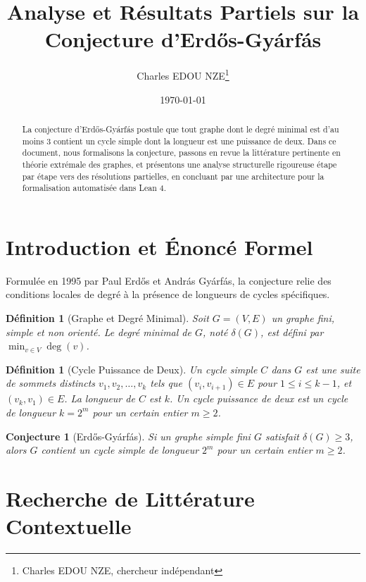 \documentclass[11pt, a4paper]{article}
\title{Analyse et R\'esultats Partiels sur la Conjecture d'Erd\H{o}s-Gy\'arf\'as}
\author{Charles EDOU NZE\thanks{Charles EDOU NZE, chercheur ind\'ependant}}
\date{\today}
\newtheorem{conjecture}[theoreme]{Conjecture}
\newtheorem{definition}[theoreme]{D\'efinition}
\begin{document}
\maketitle

\begin{abstract}
La conjecture d'Erd\H{o}s-Gy\'arf\'as postule que tout graphe dont le degr\'e minimal est d'au moins 3 contient un cycle simple dont la longueur est une puissance de deux. Dans ce document, nous formalisons la conjecture, passons en revue la litt\'erature pertinente en th\'eorie extr\'emale des graphes, et pr\'esentons une analyse structurelle rigoureuse \'etape par \'etape vers des r\'esolutions partielles, en concluant par une architecture pour la formalisation automatis\'ee dans Lean 4.
\end{abstract}

\section{Introduction et \'Enonc\'e Formel}

Formul\'ee en 1995 par Paul Erd\H{o}s et Andr\'as Gy\'arf\'as, la conjecture relie des conditions locales de degr\'e \`a la pr\'esence de longueurs de cycles sp\'ecifiques.

\begin{definition}[Graphe et Degr\'e Minimal]
Soit $G = (V, E)$ un graphe fini, simple et non orient\'e. Le degr\'e minimal de $G$, not\'e $\delta(G)$, est d\'efini par $\min_{v \in V} \deg(v)$.
\end{definition}

\begin{definition}[Cycle Puissance de Deux]
Un cycle simple $C$ dans $G$ est une suite de sommets distincts $v_1, v_2, \dots, v_k$ tels que $(v_i, v_{i+1}) \in E$ pour $1 \le i \le k-1$, et $(v_k, v_1) \in E$. La longueur de $C$ est $k$. Un cycle puissance de deux est un cycle de longueur $k = 2^m$ pour un certain entier $m \ge 2$.
\end{definition}

\begin{conjecture}[Erd\H{o}s-Gy\'arf\'as]
Si un graphe simple fini $G$ satisfait $\delta(G) \ge 3$, alors $G$ contient un cycle simple de longueur $2^m$ pour un certain entier $m \ge 2$.
\end{conjecture}

\section{Recherche de Litt\'erature Contextuelle}
\end{document}
